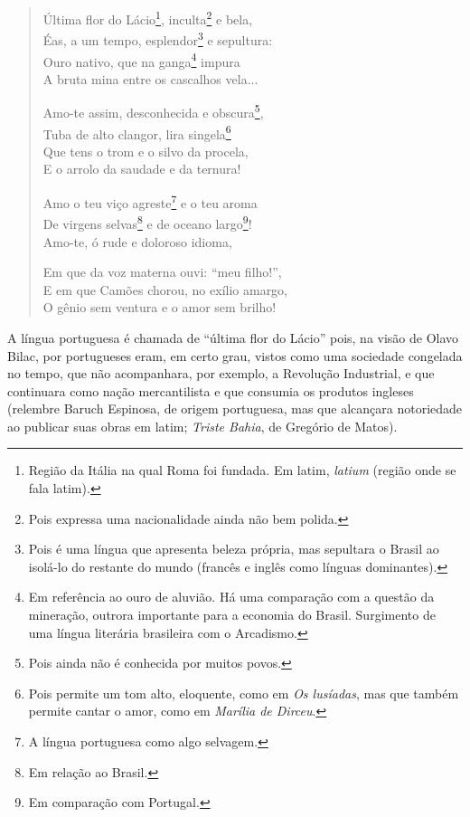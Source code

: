 \begin{verse}
Última flor do Lácio\footnote{Região da Itália na qual Roma foi fundada. Em latim, \textit{latium} (região onde se fala latim).}, inculta\footnote{Pois expressa uma nacionalidade ainda não bem polida.} e bela, \\
Éas, a um tempo, esplendor\footnote{Pois é uma língua que apresenta beleza própria, mas sepultara o Brasil ao isolá-lo do restante do mundo (francês e inglês como línguas dominantes).} e sepultura: \\
Ouro nativo, que na ganga\footnote{Em referência ao ouro de aluvião. Há uma comparação com a questão da mineração, outrora importante para a economia do Brasil. Surgimento de uma língua literária brasileira com o Arcadismo.} impura \\
A bruta mina entre os cascalhos vela...

Amo-te assim, desconhecida e obscura\footnote{Pois ainda não é conhecida por muitos povos.}, \\
Tuba de alto clangor, lira singela\footnote{Pois permite um tom alto, eloquente, como em \textit{Os lusíadas}, mas que também permite cantar o amor, como em \textit{Marília de Dirceu}.} \\
Que tens o trom e o silvo da procela, \\
E o arrolo da saudade e da ternura!

Amo o teu viço agreste\footnote{A língua portuguesa como algo selvagem.} e o teu aroma \\
De virgens selvas\footnote{Em relação ao Brasil.} e de oceano largo\footnote{Em comparação com Portugal.}! \\
Amo-te, ó rude e doloroso idioma,

Em que da voz materna ouvi: “meu filho!”, \\
E em que Camões chorou, no exílio amargo, \\
O gênio sem ventura e o amor sem brilho!
\end{verse}

A língua portuguesa é chamada de ``última flor do Lácio'' pois, na visão de Olavo Bilac, por portugueses eram, em certo grau, vistos como uma sociedade congelada no tempo, que não acompanhara, por exemplo, a Revolução Industrial, e que continuara como nação mercantilista e que consumia os produtos ingleses (relembre Baruch Espinosa, de origem portuguesa, mas que alcançara notoriedade ao publicar suas obras em latim; \textit{Triste Bahia}, de Gregório de Matos).

